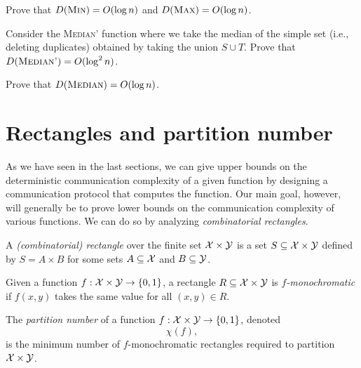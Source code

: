 \exercises

\begin{exercise} %
	Prove that $D(\textsc{Min}) = O(\log n)$ and $D(\textsc{Max}) = O(\log n)$.
\end{exercise}

\begin{exercise}
	Consider the \textsc{Median'} function where we take the median of the simple set (i.e., deleting duplicates) obtained by taking the union $S \cup T$. 
	Prove that $D(\textsc{Median'}) = O(\log^2 n)$.
\end{exercise}

\begin{exercise} %
	Prove that $D(\textsc{Median}) = O(\log n)$.
\end{exercise}


\section{Rectangles and partition number}

As we have seen in the last sections, we can give upper bounds on the deterministic communication complexity of a given function by designing a communication protocol that computes the function. Our main goal, however, will generally be to prove lower bounds on the communication complexity of various functions. We can do so by analyzing \emph{combinatorial rectangles}.

\begin{definition}[Rectangle]
	A \emph{(combinatorial) rectangle} over the finite set $\mathcal{X} \times \mathcal{Y}$ is a set $S \subseteq \mathcal{X} \times \mathcal{Y}$ defined by $S = A \times B$ for some sets $A \subseteq \mathcal{X}$ and $B \subseteq \mathcal{Y}$.
\end{definition}

\begin{definition}[$f$-monochromatism]
	Given a function $f : \mathcal{X} \times \mathcal{Y} \to \{0,1\}$, a rectangle $R \subseteq \mathcal{X} \times \mathcal{Y}$ is \emph{$f$-monochromatic} if $f(x,y)$ takes the same value for all $(x,y) \in R$.
\end{definition}

\begin{definition}[$\chi$]
	The \emph{partition number} of a function $f : \mathcal{X} \times \mathcal{Y} \to \{0,1\}$, denoted
	\[
	\chi(f),
	\]
	is the minimum number of $f$-monochromatic rectangles required to partition $\mathcal{X} \times \mathcal{Y}$.
\end{definition}



